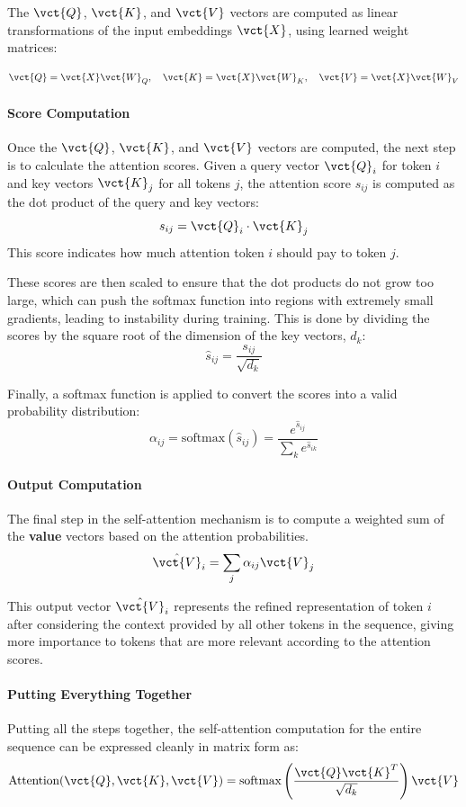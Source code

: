 The \(\vct{Q}\), \(\vct{K}\), and \(\vct{V}\) vectors are computed as linear transformations of the input embeddings \(\vct{X}\), using learned weight matrices:

\[
    \vct{Q} = \vct{X} \vct{W}_Q, \quad
    \vct{K} = \vct{X} \vct{W}_K, \quad
    \vct{V} = \vct{X} \vct{W}_V
\]

\paragraph{Score Computation}
Once the \(\vct{Q}\), \(\vct{K}\), and \(\vct{V}\) vectors are computed, the next step is to calculate the attention scores.
Given a query vector \(\vct{Q}_i\) for token \(i\) and key vectors \(\vct{K}_j\) for all tokens \(j\), the attention score \(s_{ij}\) is computed as the dot product of the query and key vectors:
\[
s_{ij} = \vct{Q}_i \cdot \vct{K}_j
\]
This score indicates how much attention token \(i\) should pay to token \(j\).

These scores are then scaled to ensure that the dot products do not grow too large, which can push the softmax function into regions with extremely small gradients, leading to instability during training. 
This is done by dividing the scores by the square root of the dimension of the key vectors, \(d_k\):
\[
\hat{s}_{ij} = \frac{s_{ij}}{\sqrt{d_k}}
\]

Finally, a softmax function is applied to convert the scores into a valid probability distribution:
\[
\alpha_{ij} = \text{softmax}(\hat{s}_{ij}) = \frac{e^{\hat{s}_{ij}}}{\sum_{k} e^{\hat{s}_{ik}}}
\]

\paragraph{Output Computation}
The final step in the self-attention mechanism is to compute a weighted sum of the \textbf{value} vectors based on the attention probabilities.
\begin{equation}
    \label{eq:weighted_sum_values}
    \hat{\vct{V}}_i = \sum_{j} \alpha_{ij} \vct{V}_j
\end{equation}

This output vector \(\hat{\vct{V}}_i\) represents the refined representation of token \(i\) after considering the context provided by all other tokens in the sequence, giving more importance to tokens that are more relevant according to the attention scores.

\paragraph{Putting Everything Together}
Putting all the steps together, the self-attention computation for the entire sequence can be expressed cleanly in matrix form as:
\[
\text{Attention}(\vct{Q}, \vct{K}, \vct{V}) = \text{softmax}\left(\frac{\vct{Q} \vct{K}^T}{\sqrt{d_k}}\right) \vct{V}
\]

